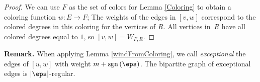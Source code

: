 \documentclass[12pt]{article}
\newtheorem{prop}{Proposition}[section]
\newtheorem{lemma}{Lemma}[section]
\theoremstyle{definition}
\theoremstyle{plain}
\newtheorem{definition}{Definition}[section]
\begin{document}
\begin {proof}
We can use $F$ as the set of colors for Lemma \ref{Coloring} to obtain a coloring function $w: E \rightarrow F$; The weights of the edges in $[v,w]$ correspond to the colored degrees in this coloring for the vertices of $R$. All vertices in~$R$ have all colored degrees equal to $1$, so $[v,w]=W_{F,R}$.
\end {proof}

\textbf{Remark.}
When applying Lemma \ref{windFromColoring}, we call \emph{exceptional} the edges of $[u,w]$ with weight $m+{\rm sgn}\,(\eps)$. The bipartite graph of exceptional edges is $|\eps|$-regular.











\end{document}

